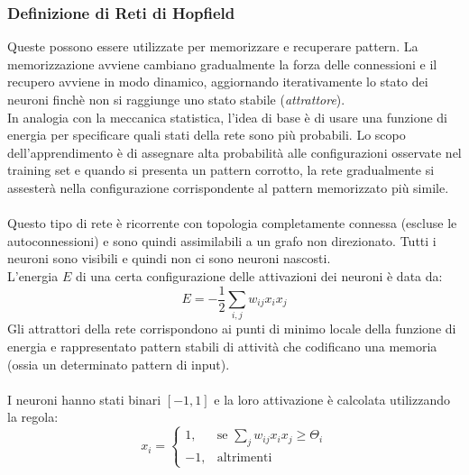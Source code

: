 \documentclass[12pt, a4paper]{article}
\begin{document}
\subsubsection{Definizione di Reti di Hopfield}
Queste possono essere utilizzate per memorizzare e recuperare pattern. La memorizzazione avviene cambiano gradualmente la forza delle connessioni e il recupero avviene in modo dinamico, aggiornando iterativamente lo stato dei neuroni finchè non si raggiunge uno stato stabile (\textit{attrattore}).\\
In analogia con la meccanica statistica, l'idea di base è di usare una funzione di energia per specificare quali stati della rete sono più probabili. Lo scopo dell'apprendimento è di assegnare alta probabilità alle configurazioni osservate nel training set e quando si presenta un pattern corrotto, la rete gradualmente si assesterà nella configurazione corrispondente al pattern memorizzato più simile.\\
\\
Questo tipo di rete è ricorrente con topologia completamente connessa (escluse le autoconnessioni) e sono quindi assimilabili a un grafo non direzionato. Tutti i neuroni sono visibili e quindi non ci sono neuroni nascosti.\\
L'energia \(E\) di una certa configurazione delle attivazioni dei neuroni è data da:
\[E=-\frac{1}{2}\sum_{i,j}w_{ij}x_ix_j\]
Gli attrattori della rete corrispondono ai punti di minimo locale della funzione di energia e rappresentato pattern stabili di attività che codificano una memoria (ossia un determinato pattern di input).\\
\\
I neuroni hanno stati binari \([-1, 1]\) e la loro attivazione è calcolata utilizzando la regola:
\[
    x_i = 
    \begin{cases} 
        1, & \mbox{se } \sum_j w_{ij}x_ix_j \geq \Theta_i \\
        -1, & \mbox{altrimenti}
    \end{cases}
\]
\end{document}
